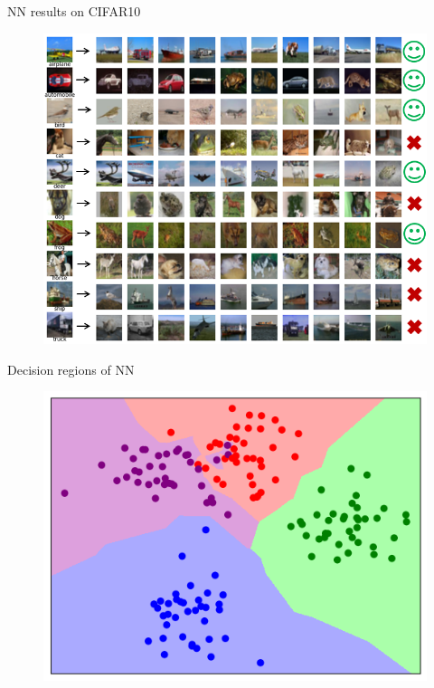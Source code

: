 \documentclass[dvipsnames]{beamer}
\begin{document}
\begin{frame}{NN results on CIFAR10}
\begin{figure}
\includegraphics[scale=.45]{figures/1nn_cifar.png}
\end{figure}
\end{frame}

\begin{frame}{Decision regions of NN }
\begin{figure}
\includegraphics[scale=.6]{figures/k_nn_boundary_k1_wotitle.png}
\end{figure}
\end{frame}
\end{document}
